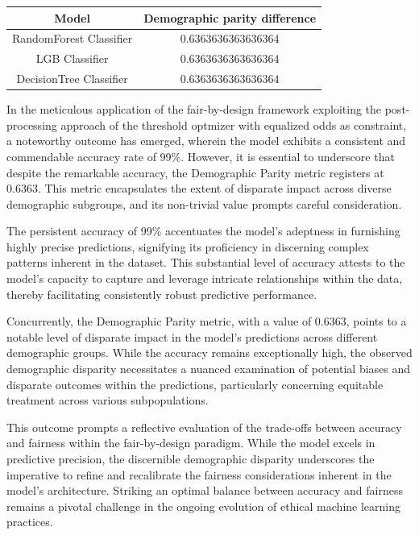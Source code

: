 \documentclass[12pt,a4paper,openright,twoside]{book}
\begin{document}
\begin{tabular}{|c|c|}
    \hline
    \textbf{Model} & \textbf{Demographic parity difference} \\
    \hline
    RandomForest Classifier & 0.6363636363636364 \\
    \hline
    LGB Classifier & 0.6363636363636364 \\
    \hline
    DecisionTree Classifier & 0.6363636363636364 \\
    \hline
\end{tabular}


In the meticulous application of the fair-by-design framework exploiting the post-processing approach of the threshold optmizer with equalized odds as constraint, a noteworthy outcome has emerged, wherein the model exhibits a consistent and commendable accuracy rate of 99\%. However, it is essential to underscore that despite the remarkable accuracy, the Demographic Parity metric registers at 0.6363. This metric encapsulates the extent of disparate impact across diverse demographic subgroups, and its non-trivial value prompts careful consideration.

The persistent accuracy of 99\% accentuates the model's adeptness in furnishing highly precise predictions, signifying its proficiency in discerning complex patterns inherent in the dataset. This substantial level of accuracy attests to the model's capacity to capture and leverage intricate relationships within the data, thereby facilitating consistently robust predictive performance.

Concurrently, the Demographic Parity metric, with a value of 0.6363, points to a notable level of disparate impact in the model's predictions across different demographic groups. While the accuracy remains exceptionally high, the observed demographic disparity necessitates a nuanced examination of potential biases and disparate outcomes within the predictions, particularly concerning equitable treatment across various subpopulations.

This outcome prompts a reflective evaluation of the trade-offs between accuracy and fairness within the fair-by-design paradigm. While the model excels in predictive precision, the discernible demographic disparity underscores the imperative to refine and recalibrate the fairness considerations inherent in the model's architecture. Striking an optimal balance between accuracy and fairness remains a pivotal challenge in the ongoing evolution of ethical machine learning practices.
\end{document}
